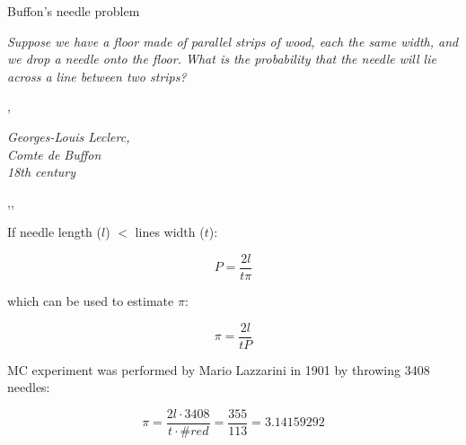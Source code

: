 \begin{wideslide}{Buffon's needle problem}
\null\vfill

  \twocolumn
  {
    {\it Suppose we have a floor made of parallel strips of wood, each the same width, and we drop a needle onto the floor. What is the probability that the needle will lie across a line between two strips?}
    
    \sep
    
    {\it\hfill Georges-Louis Leclerc,\\\hfill Comte de Buffon\\\hfill 18th century}
  }
  {
    \sep\sep
    \centering
  }
  
  \vspace{-10pt}
  
  \twocolumn
  {
    If needle length ($l$) $<$ lines width ($t$):
    
    $$P = \frac{2l}{t\pi}$$
    
    which can be used to estimate $\pi$:
    
    $$\pi = \frac{2l}{tP}$$
  }
  {
    MC experiment was performed by Mario Lazzarini in 1901 by throwing 3408 needles:
    
    $$\pi = \frac{2l \cdot 3408}{t \cdot \#red} = \frac{355}{113} = 3.14159292$$
  }
  
\vfill\null
\end{wideslide}

